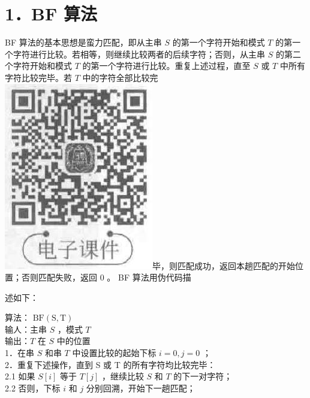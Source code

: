 \documentclass[10pt]{article}
\begin{document}
\section*{1．BF 算法}
BF 算法的基本思想是蛮力匹配，即从主串 $S$ 的第一个字符开始和模式 $T$ 的第一个字符进行比较。若相等，则继续比较两者的后续字符；否则，从主串 $S$ 的第二个字符开始和模式 $T$ 的第一个字符进行比较。重复上述过程，直至 $S$ 或 $T$ 中所有字符比较完毕。若 $T$ 中的字符全部比较完\\
\includegraphics[max width=\textwidth]{2025_06_06_704745ea57b15b2333e5g-116(1)}毕，则匹配成功，返回本趟匹配的开始位置；否则匹配失败，返回 0 。 BF 算法用伪代码描

述如下：

算法： $\mathrm{BF}(\mathrm{S}, \mathrm{T})$\\
输人：主串 $S$ ，模式 $T$\\
输出：$T$ 在 $S$ 中的位置\\
1．在串 $S$ 和串 $T$ 中设置比较的起始下标 $i=0, j=0$ ；\\
2．重复下述操作，直到 S 或 T 的所有字符均比较完毕：\\
2.1 如果 $S[i]$ 等于 $T[j]$ ，继续比较 $S$ 和 $T$ 的下一对字符；\\
2.2 否则，下标 $i$ 和 $j$ 分别回溯，开始下一趟匹配；
\end{document}
